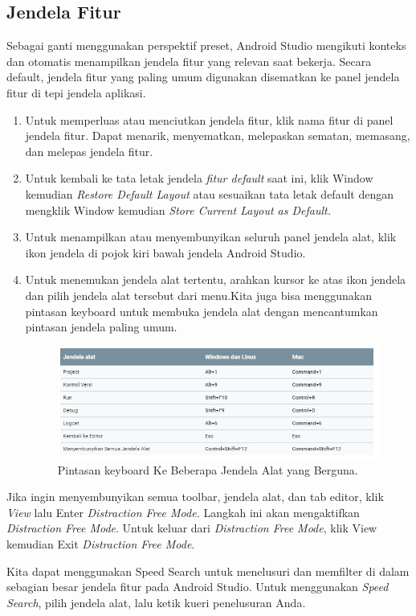 \subsection{Jendela Fitur}
\par Sebagai ganti menggunakan perspektif preset, Android Studio mengikuti konteks dan otomatis menampilkan jendela fitur yang relevan saat bekerja. Secara default, jendela fitur yang paling umum digunakan disematkan ke panel jendela fitur di tepi jendela aplikasi.
\begin{enumerate}
    \item Untuk memperluas atau menciutkan jendela fitur, klik nama fitur di panel jendela fitur. Dapat menarik, menyematkan, melepaskan sematan, memasang, dan melepas jendela fitur.
    \item Untuk kembali ke tata letak jendela \textit{fitur default} saat ini, klik Window kemudian\textit{ Restore Default Layout} atau sesuaikan tata letak default dengan mengklik Window kemudian \textit{Store Current Layout as Default.}
    \item Untuk menampilkan atau menyembunyikan seluruh panel jendela alat, klik ikon jendela  di pojok kiri bawah jendela Android Studio.
    \item Untuk menemukan jendela alat tertentu, arahkan kursor ke atas ikon jendela dan pilih jendela alat tersebut dari menu.Kita juga bisa menggunakan pintasan keyboard untuk membuka jendela alat dengan mencantumkan pintasan jendela paling umum.
    \begin{figure}[H]
    \centering
    \includegraphics[width=1\textwidth]{figures/android7.png}
    \caption{ Pintasan keyboard Ke Beberapa Jendela Alat yang Berguna.}
    \label{print}
    \end{figure}
\end{enumerate}

\par Jika ingin menyembunyikan semua toolbar, jendela alat, dan tab editor, klik\textit{ View }lalu Enter \textit{Distraction Free Mode.} Langkah ini akan mengaktifkan \textit{Distraction Free Mode}. Untuk keluar dari \textit{Distraction Free Mode}, klik View kemudian  Exit \textit{Distraction Free Mode}.\\
\par Kita dapat menggunakan Speed Search untuk menelusuri dan memfilter di dalam sebagian besar jendela fitur pada Android Studio. Untuk menggunakan \textit{Speed Search}, pilih jendela alat, lalu ketik kueri penelusuran Anda.

